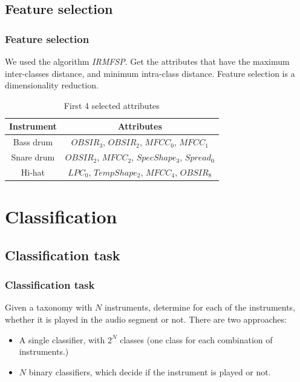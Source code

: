 \documentclass{beamer}
\begin{document}
    \subsection{Feature selection}
    \begin{frame}
        \frametitle{Feature selection}
        We used the algorithm \emph{IRMFSP}. Get the attributes that have the maximum inter-classes distance, and minimum intra-class distance. Feature selection is a dimensionality reduction.
        \begin{center}
        \begin{table}
        \caption{First 4 selected attributes}
        \begin{tabular}{|c|c|}
        \hline
        Instrument&Attributes\\
        \hline
        Bass drum&$OBSIR_3$, $OBSIR_2$, $MFCC_0$, $MFCC_1$\\
        \hline
        Snare drum&$OBSIR_2$, $MFCC_2$, $SpecShape_3$, $Spread_0$\\
        \hline
        Hi-hat&$LPC_0$, $TempShape_2$, $MFCC_4$, $OBSIR_8$\\
        \hline
        \end{tabular}
        \end{table}
        \end{center}
    \end{frame}
    \section{Classification}
    \subsection{Classification task}
    \begin{frame}
        \frametitle{Classification task}
        Given a taxonomy with $N$ instruments, determine for each of the instruments, whether it is played in the audio segment or not.
        There are two approaches:
        \begin{itemize}
            \item A single classifier, with $2^N$ classes (one class for each combination of instruments.)
            \item $N$ binary classifiers, which decide if the instrument is played or not.
        \end{itemize}
    \end{frame}
\end{document}
